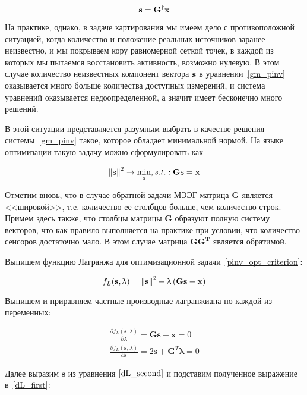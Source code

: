 \begin{equation*}
    \mathbf{s} = \mathbf{G}^\dagger\mathbf{x}
\end{equation*}

На практике, однако, в задаче картирования мы имеем дело с противоположной ситуацией,
когда количество и положение реальных источников заранее неизвестно, и мы
покрываем кору равномерной сеткой точек, в каждой из которых мы пытаемся восстановить активность,
возможно нулевую. В этом случае количество неизвестных компонент вектора $\mathbf{s}$ в уравнении~\ref{gm_pinv}
оказывается много больше количества доступных измерений,
и система уравнений оказывается недоопределенной, а значит имеет бесконечно много решений.

В этой ситуации представляется разумным выбрать в качестве решения системы~\ref{gm_pinv}
такое, которое обладает минимальной нормой.
На языке оптимизации такую задачу можно сформулировать как

\begin{equation}
    \left\lVert\mathbf{s}\right\rVert^2 \rightarrow \underset{\mathbf{s}}{\min},
    s.t.: \mathbf{G} \mathbf{s} = \mathbf{x}
    \label{pinv_opt_criterion}
\end{equation}

Отметим вновь, что в случае обратной задачи МЭЭГ матрица $\mathbf{G}$ является
<<широкой>>, т.е.  количество ее столбцов больше, чем количество строк. Примем
здесь также, что столбцы матрицы $\mathbf{G}$ образуют полную систему векторов,
что как правило выполняется на практике при условии, что количество сенсоров
достаточно мало. В этом случае матрица $\mathbf{GG^T}$ является обратимой.

Выпишем функцию Лагранжа для оптимизационной задачи~\ref{pinv_opt_criterion}:

\begin{equation}
    f_L(\mathbf{s}, \uplambda) = \left\lVert\mathbf{s}\right\rVert^2 + \uplambda \left(\mathbf{Gs - x}\right)
\end{equation}

Выпишем и приравняем частные производные лагранжиана по каждой из переменных:

\begin{gather}
    \frac{\partial f_L(\mathbf{s}, \lambda)}{\partial \lambda} = \mathbf{Gs - x} = 0
    \label{dL_first} \\
    \frac{\partial f_L(\mathbf{s}, \lambda)}{\partial \mathbf{s}} = 2\mathbf{s}
    + \mathbf{G}^T\mathbf{\lambda} = 0
    \label{dL_second}
\end{gather}

Далее выразим $\mathbf{s}$ из уравнения $\ref{dL_second}$ и подставим
полученное выражение в~\ref{dL_first}:

